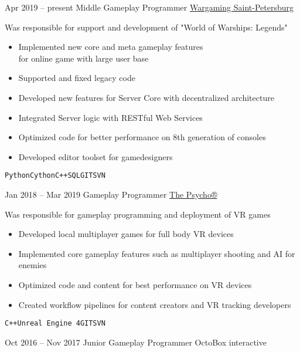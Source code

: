 \documentclass[9pt]{developercv} %
\begin{document}
\begin{center}
	\vspace{-\baselineskip} %
	\begin{barchart}{5.5}
	\end{barchart}
\end{center}



\begin{entrylist}
	\entry
	{Apr 2019 -- present}
	{Middle Gameplay Programmer}
	{\href{https://na.wargaming.net/en/games/wowsconsole}{Wargaming Saint-Petersburg}}
	{

		Was responsible for support and development of "World of Warships: Legends"
		\begin{itemize}
			\item Implemented new core and meta gameplay features \\for online game with large user base
			\item Supported and fixed legacy code
			\item Developed new features for Server Core with decentralized architecture
			\item Integrated Server logic with RESTful Web Services
			\item Optimized code for better performance on 8th generation of consoles
			\item Developed editor toolset for gamedesigners
		\end{itemize}
		\texttt{Python}\slashsep\texttt{Cython}\slashsep\texttt{C++}\slashsep\texttt{SQL}\slashsep\texttt{GIT}\slashsep\texttt{SVN}}
	\entry
	{Jan 2018 -- Mar 2019}
	{Gameplay Programmer}
	{\href{https://www.thepsycho.net/}{The Psycho®}}
	{

	Was responsible for gameplay programming and deployment of VR games
	\begin{itemize}
		\item Developed local multiplayer games for full body VR devices
		\item Implemented core gameplay features such as multiplayer shooting and AI for enemies
		\item Optimized code and content for best performance on VR devices
		\item Created workflow pipelines for content creators and VR tracking developers
	\end{itemize}
	{\texttt{C++}\slashsep\texttt{Unreal Engine 4}\slashsep\texttt{GIT}\slashsep\texttt{SVN}}
	}
	\entry
	{Oct 2016 -- Nov 2017}
	{Junior Gameplay Programmer}
	{OctoBox interactive}
	{

}
\end{entrylist}
\end{document}
